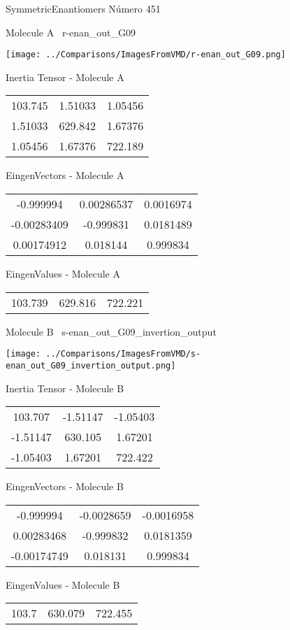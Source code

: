 \vtab[-3cm]
\begin{center}
{\large SymmetricEnantiomers \tab Número 451}
\end{center}
\begin{multicols}{2}
\begin{center}

Molecule A \
r-enan\_out\_G09

\texttt{[image: ../Comparisons/ImagesFromVMD/r-enan\_out\_G09.png]}

Inertia Tensor - Molecule A \\
\begin{tabular}{|c c c|}
103.745	 & 	1.51033	 & 	1.05456	 \\
1.51033	 & 	629.842	 & 	1.67376	 \\
1.05456	 & 	1.67376	 & 	722.189
\end{tabular}

\vtab
 EingenVectors - Molecule A     \\
\begin{tabular}{|c c c|}
-0.999994	 & 	0.00286537	 & 	0.0016974	 \\
-0.00283409	 & 	-0.999831	 & 	0.0181489	 \\
0.00174912	 & 	0.018144	 & 	0.999834
\end{tabular}

\vtab
 EingenValues - Molecule A     \\
\begin{tabular}{|c c c|}
103.739	 & 	629.816	 & 	722.221	 \\
\end{tabular}
\columnbreak

Molecule B \
s-enan\_out\_G09\_invertion\_output

\texttt{[image: ../Comparisons/ImagesFromVMD/s-enan\_out\_G09\_invertion\_output.png]}

Inertia Tensor - Molecule B \\
\begin{tabular}{|c c c|}
103.707	 & 	-1.51147	 & 	-1.05403	 \\
-1.51147	 & 	630.105	 & 	1.67201	 \\
-1.05403	 & 	1.67201	 & 	722.422
\end{tabular}

\vtab
 EingenVectors - Molecule B     \\
\begin{tabular}{|c c c|}
-0.999994	 & 	-0.0028659	 & 	-0.0016958	 \\
0.00283468	 & 	-0.999832	 & 	0.0181359	 \\
-0.00174749	 & 	0.018131	 & 	0.999834
\end{tabular}

\vtab
 EingenValues - Molecule B     \\
\begin{tabular}{|c c c|}
103.7	 & 	630.079	 & 	722.455	 \\
\end{tabular}

\end{center}
\end{multicols}

